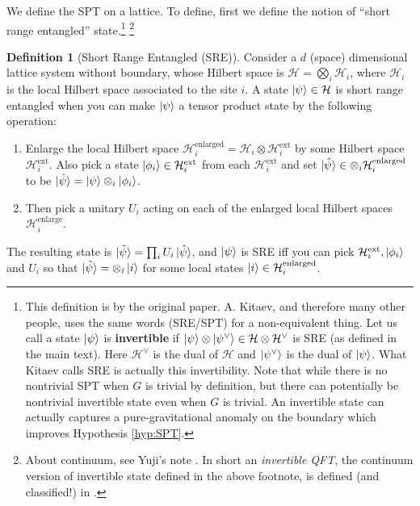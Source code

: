 \documentclass[
]{scrartcl}
\providecommand{\tightlist}{%
  \setlength{\itemsep}{0pt}\setlength{\parskip}{0pt}}
\numberwithin{equation}{section}
\theoremstyle{definition}
\newtheorem{definition}{Definition}[section]
\theoremstyle{definition}
\theoremstyle{definition}
\theoremstyle{definition}
\theoremstyle{remark}
\begin{document}
We define the SPT on a lattice.
To define, first we define the notion of ``short range entangled'' state.\footnote{This definition is by the original paper. A. Kitaev, and therefore many other people, uses the same words (SRE/SPT) for a non-equivalent thing. Let us call a state \(\ket{\psi}\) is \textbf{invertible} if \(\ket{\psi}\otimes \ket{\psi^\vee} \in \mathcal{H} \otimes \mathcal{H}^\vee\) is SRE (as defined in the main text). Here \(\mathcal{H}^\vee\) is the dual of \(\mathcal{H}\) and \(\ket{\psi^\vee}\) is the dual of \(\ket{\psi}\). What Kitaev calls SRE is actually this invertibility.
  Note that while there is no nontrivial SPT when \(G\) is trivial by definition, but there can potentially be nontrivial invertible state even when \(G\) is trivial. An invertible state can actually captures a pure-gravitational anomaly on the boundary which improves Hypothesis \ref{hyp:SPT}.} \footnote{About continuum, see Yuji's note \textcite{tachikawa_2019}. In short an \emph{invertible QFT}, the continuum version of invertible state defined in the above footnote, is defined (and classified!) in \textcite{Freed:2016rqq} \textcite{Yonekura:2018ufj}.}

\begin{definition}[Short Range Entangled (SRE)]
\protect\hypertarget{def:SRE}{}\label{def:SRE}Consider a \(d\) (space) dimensional lattice system without boundary, whose Hilbert space is \(\mathcal{H} = \bigotimes_{i} \mathcal{H}_i\), where \(\mathcal{H}_i\) is the local Hilbert space associated to the site \(i\).
A state \(\ket{\psi} \in \mathcal{H}\) is short range entangled when you can make \(\ket{\psi}\) a tensor product state by the following operation:

\begin{enumerate}
\def\labelenumi{\arabic{enumi}.}
\tightlist
\item
  Enlarge the local Hilbert space \(\mathcal{H}^\text{enlarged}_i = \mathcal{H}_i \otimes \mathcal{H}_i^\text{ext}\) by some Hilbert space \(\mathcal{H}_i^\text{ext}\).
  Also pick a state \(\ket{\phi_i} \in \mathcal{H}_i^\text{ext}\) from each \(\mathcal{H}_i^\text{ext}\) and set \(\ket{\hat\psi}\in \otimes_i \mathcal{H}_i^\text{enlarged}\) to be \(\ket{\hat\psi} = \ket{\psi}\otimes_i \ket{\phi_i}\).
\item
  Then pick a unitary \(U_i\) acting on each of the enlarged local Hilbert spaces \(\mathcal{H}_i^\text{enlarge}\).
\end{enumerate}

The resulting state is \(\ket{\tilde{\psi}}=\prod_i U_i \ket{\hat{\psi}}\), and \(\ket{\psi}\) is SRE iff you can pick \(\mathcal{H}_i^\text{ext}, \ket{\phi_i}\) and \(U_i\) so that \(\ket{\tilde{\psi}} = \otimes_i \ket{i}\) for some local states \(\ket{i} \in \mathcal{H}^\text{enlarged}_i\).
\end{definition}
\end{document}
